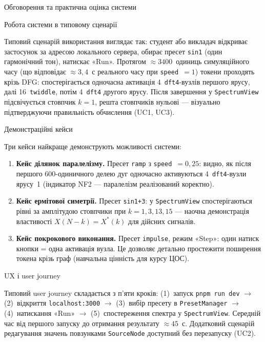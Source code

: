 \protect{}\label{_Toc229681182}{}Обговорення та практична
оцінка системи

Робота системи в типовому сценарії

Типовий сценарій використання виглядає так: студент або викладач
відкриває застосунок за адресою локального сервера, обирає пресет
\texttt{sin1} (один гармонічний тон), натискає «Run». Протягом
\(\approx 3400\)~одиниць симуляційного часу (що відповідає
\(\approx 3,4\)~с реального часу при \texttt{speed}~\(= 1\)) токени
проходять крізь DFG: спостерігається одночасна активація
4~\texttt{dft4}-вузлів першого ярусу, далі 16~\texttt{twiddle}, потім
4~\texttt{dft4} другого ярусу. Після завершення у \texttt{SpectrumView}
підсвічується стовпчик \(k = 1\), решта стовпчиків нульові --- візуально
підтверджуючи правильність обчислення (UC1, UC3).

Демонстраційні кейси

Три кейси найкраще демонструють можливості системи:

\begin{enumerate}
\def\labelenumi{\arabic{enumi}.}
\item
  \textbf{Кейс ділянок паралелізму.} Пресет \texttt{ramp} з
  \texttt{speed}~\(= 0,25\): видно, як після першого 600-одиничного
  делею дуг одночасно активуються 4~\texttt{dft4}-вузли ярусу~1
  (індикатор NF2 --- паралелізм реалізований коректно).
\item
  \textbf{Кейс ермітової симетрії.} Пресет \texttt{sin1+3}: у
  \texttt{SpectrumView} спостерігаються рівні за амплітудою стовпчики
  при \(k = 1,3,13,15\) --- наочна демонстрація властивості
  \(X(N - k) = X^{*}(k)\) для дійсних сигналів.
\item
  \textbf{Кейс покрокового виконання.} Пресет \texttt{impulse}, режим
  «Step»: один натиск кнопки = одна активація вузла. Це дозволяє
  детально простежити поширення токена крізь граф (навчальна цінність
  для курсу ЦОС).
\end{enumerate}

UX і user journey

Типовий user journey складається з п'яти кроків: (1)~запуск
\texttt{pnpm\ run\ dev} \(\rightarrow\) (2)~відкриття
\texttt{localhost:3000} \(\rightarrow\) (3)~вибір пресету в
\texttt{PresetManager} \(\rightarrow\) (4)~натискання «Run»
\(\rightarrow\) (5)~спостереження спектра у \texttt{SpectrumView}.
Середній час від першого запуску до отримання результату
\(\approx 45\)~с. Додатковий сценарій редагування значень повзунками
\texttt{SourceNode} доступний без перезапуску (UC2).

